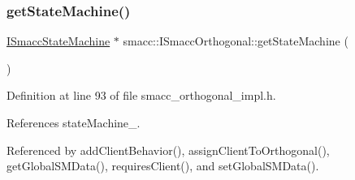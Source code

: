 \subsubsection{\texorpdfstring{get\+State\+Machine()}{getStateMachine()}}
{\footnotesize\ttfamily \hyperlink{classsmacc_1_1ISmaccStateMachine}{I\+Smacc\+State\+Machine} $\ast$ smacc\+::\+I\+Smacc\+Orthogonal\+::get\+State\+Machine (\begin{DoxyParamCaption}{ }\end{DoxyParamCaption})\hspace{0.3cm}{\ttfamily [inline]}}



Definition at line 93 of file smacc\+\_\+orthogonal\+\_\+impl.\+h.



References state\+Machine\+\_\+.



Referenced by add\+Client\+Behavior(), assign\+Client\+To\+Orthogonal(), get\+Global\+S\+M\+Data(), requires\+Client(), and set\+Global\+S\+M\+Data().


